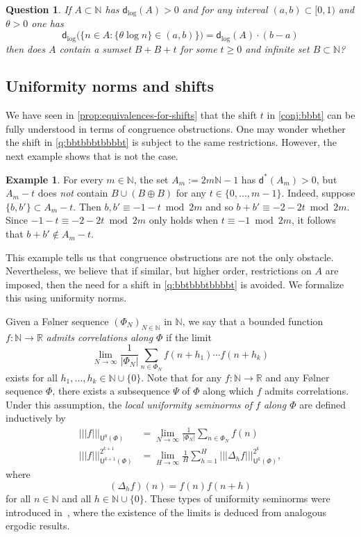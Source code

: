 \documentclass[10pt,dvipsnames]{article}
\newtheorem{question}[theorem]{Question}
\theoremstyle{definition}
\newtheorem{example}[theorem]{Example}
\theoremstyle{plain}
\newcommand{\define}[1]{\textit{#1}}
\newcommand{\R}{\mathbb{R}}
\newcommand{\N}{\mathbb{N}}
\newcommand{\dens}{\mathsf{d}}
\newcommand{\ubdens}{\mathsf{d}^*}
\newcommand{\Folner}{F\o{}lner}
\newcommand{\ghk}{|\!|\!|}
\newcommand{\ghkn}[1]{\ghk {#1} \ghk}
\newcommand{\un}[2]{{\mathsf{U}^{#1}(#2)}}
\begin{document}
\begin{question}
If $A\subset\N$ has $\dens_{\log}(A)>0$ and for any interval $(a,b)\subset[0,1)$ and $\theta>0$ one has
\[
\dens_{\log}\Big(\Big\{n\in A:\big\{\theta\log n\}\in(a,b)\Big\}\Big)=\dens_{\log}(A)\cdot(b-a)
\]
then does $A$ contain a sumset $B+B+t$ for some $t\geq0$ and  infinite set $B\subset\N$?
\end{question}

\subsection{Uniformity norms and shifts}
\label{sec_uniformity_norms}

We have seen in \cref{prop:equivalences-for-shifts} that the shift $t$ in \cref{conj:bbbt} can be fully understood in terms of congruence obstructions.
One may wonder whether the shift in \cref{q:bbtbbbtbbbbt} is subject to the same restrictions.
However, the next example shows that is not the case.

\begin{example}
\label{example_shift-needed} 
For every $m\in\N$, the set $A_m:=2m\N-1$ has $\ubdens(A_m)>0$, but $A_m-t$ does \emph{not} contain $B\cup(B\oplus B)$ for any $t\in\{0,\dots,m-1\}$.
Indeed, suppose $\{b,b'\}\subset A_m-t$. Then $b,b'\equiv-1-t\bmod2m$ and so $b+b'\equiv-2-2t \bmod2m$. 
Since $-1-t\equiv-2-2t\bmod2m$ only holds when $t\equiv-1\bmod2m$, it follows that $b+b'\notin A_m-t$.
\end{example}
This example tells us that congruence obstructions are not the only obstacle.
Nevertheless, we believe that if similar, but higher order, restrictions on $A$ are imposed, then the need for a shift in \cref{q:bbtbbbtbbbbt} is avoided. 
We formalize this using uniformity norms. 

 
Given a \Folner{} sequence $(\Phi_N)_{N\in\N}$ in $\N$, we say that a bounded function $f\colon \N\to\R$ \define{admits correlations along $\Phi$} if the limit
\[
\lim_{N\to\infty} \frac{1}{|\Phi_N|}\sum_{n\in\Phi_N} f(n+h_1)\cdots f(n+h_k)
\]
exists for all $h_1,\ldots,h_k\in\N\cup\{0\}$.
Note that for any $f\colon \N\to\R$ and any F\o lner sequence $\Phi$, there exists a subsequence $\Psi$ of $\Phi$ along which $f$ admits correlations. 
Under this assumption, the \define{local uniformity seminorms of $f$ along $\Phi$} are defined inductively by
\begin{align*}
\ghkn{f}_\un{0}{\Phi}
&
=
\lim_{N\to\infty} \frac{1}{|\Phi_N|}\sum_{n\in\Phi_N} f(n)
\\
\ghkn{f}_\un{k+1}{\Phi}^{2^{k+1}}
&
=
\lim_{H\to\infty} \frac{1}{H}\sum_{h=1}^H \ghkn{\Delta_h f}_\un{k}{\Phi}^{2^k}, 
\end{align*}
 where
\[
(\Delta_h f)(n)=f(n)f(n+h)
\]
for all $n \in \N$ and all $h \in \N \cup \{0\}$.
These types of uniformity seminorms were introduced in~\cite{HK-uniformity}, where the existence of the limits is deduced from analogous ergodic results.
\end{document}
